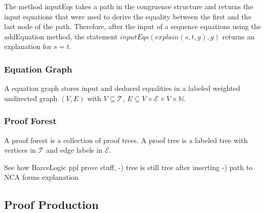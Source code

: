 The method inputEqs takes a path in the congruence structure and returns the input equations that were used to derive the equality between the first and the last node of the path.
Therefore, after the input of a sequence equations using the addEquation method, the statement $inputEqs(explain(s,t,g),g)$ returns an explanation for $s = t$.




\subsubsection*{Equation Graph}

A equation graph stores input and deduced equalities in a labeled weighted undirected graph $(V,E)$ with 
$V \subseteq \mathcal{T}$, $E \subseteq V \times \mathcal{E} \times V \times \mathbb{N}$.







\subsubsection*{Proof Forest}

A proof forest is a collection of proof trees.
A proof tree is a labeled tree with vertices in $\mathcal{T}$ and edge labels in $\mathcal{E}$.



See how BarceLogic ppl prove stuff,
-) tree is still tree after inserting
-) path to NCA forms explanation


\subsection*{Proof Production}




